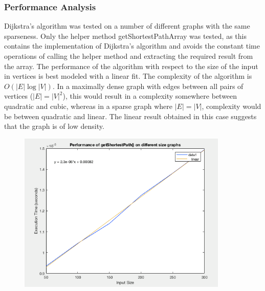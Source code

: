 \documentclass[11pt]{article}
\begin{document}
	\subsubsection{Performance Analysis}
	Dijkstra's algorithm was tested on a number of different graphs with the same sparseness. Only the helper method getShortestPathArray was tested, as this contains the implementation of Dijkstra's algorithm and avoids the constant time operations of calling the helper method and extracting the required result from the array.
	\newline
	The performance of the algorithm with respect to the size of the input in vertices is best modeled with a linear fit. The complexity of the algorithm is \(O(|E|\log|V|)\). In a maximally dense graph with edges between all pairs of vertices (\(|E| = |V|^2\)), this would result in a complexity somewhere between quadratic and cubic, whereas in a sparse graph where \(|E| = |V|\), complexity would be between quadratic and linear. The linear result obtained in this case suggests that the graph is of low density.
	\begin{figure}[h!]
 		\centering
 		\includegraphics[width=100mm,scale=0.5]{images/dijkstra.png}
 	\end{figure}
\end{document}

